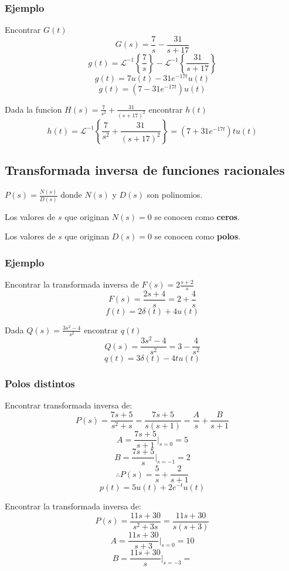 \documentclass[11pt]{article}
\begin{document}
\subsubsection{Ejemplo}
\label{sec:orgheadline21}
Encontrar \(G(t)\)
$$G(s)=\frac{7}{s}-\frac{31}{s+17}$$
$$g(t)=\mathcal{L}^{-1}\left\{\frac{7}{s} \right\}-\mathcal{L}^{-1}\left\{\frac{31}{s+17}\right\}$$
$$g(t)=7u(t)-31e^{-17t}u(t)$$
$$g(t)=\left( 7-31e^{-17t} \right)u(t)$$

Dada la funcion \(H(s)=\frac{7}{s^2}+\frac{31}{(s+17)^2}\)
encontrar \(h(t)\)
$$h(t)=\mathcal{L}^{-1}\left\{\frac{7}{s^2}+\frac{31}{(s+17)^2}\right\}=(7+31e^{-17t})tu(t)$$
\subsection{Transformada inversa de funciones racionales}
\label{sec:orgheadline25}
\(P(s)=\frac{N(s)}{D(s)}\) donde \(N(s)\) y \(D(s)\) son polinomios.

Los valores de \(s\) que originan \(N(s)=0\) se conocen como
\textbf{ceros}.

Los valores de \(s\) que originan \(D(s)=0\) se conocen como
\textbf{polos}.
\subsubsection{Ejemplo}
\label{sec:orgheadline23}
Encontrar la transformada inversa de \(F(s)=2 \frac{s+2}{s}\)
$$F(s)=\frac{2s+4}{s}=2+\frac{4}{s}$$
$$f(t)=2\delta (t)+4u(t)$$

Dada \(Q(s)=\frac{3s^2-4}{s^2}\) encontrar \(q(t)\)
$$Q(s)=\frac{3s^2-4}{s^2}=3-\frac{4}{s^{2}}$$
$$q(t)=3\delta (t)-4tu(t)$$
\subsubsection{Polos distintos}
\label{sec:orgheadline24}
Encontrar transformada inversa de:
$$P(s)=\frac{7s+5}{s^2+s}=\frac{7s+5}{s(s+1)}=\frac{A}{s}+\frac{B}{s+1}$$
$$A=\frac{7s+5}{s+1}\bigg|_{s=0}=5$$
$$B=\frac{7s+5}{s}\bigg|_{s=-1}=2$$
$$\therefore P(s)=\frac{5}{s}+\frac{2}{s+1}$$
$$p(t)=5u(t)+2e^{-t}u(t)$$

Encontrar la transformada inversa de:
$$P(s)=\frac{11s+30}{s^2+3s}=\frac{11s+30}{s(s+3)}$$
$$A=\frac{11s+30}{s+3}\bigg|_{s=0}=10$$
$$B=\frac{11s+30}{s}\bigg|_{s=-3}=$$
\end{document}
